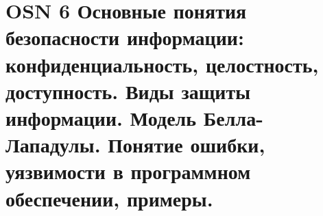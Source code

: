 \section*{OSN 6 Основные понятия безопасности информации: конфиденциальность, целостность, доступность. Виды защиты информации. Модель Белла-Лападулы. Понятие ошибки, уязвимости в программном обеспечении, примеры.}
